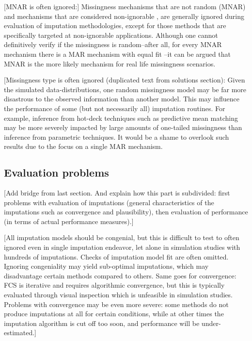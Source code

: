 \documentclass[bimj,fleqn]{w-art}
\theoremstyle{plain}
\theoremstyle{definition}
\begin{document}
[MNAR is often ignored:] Missingness mechanisms that are not random (MNAR) and mechanisms that are considered non-ignorable \citep[see e.g.][]{rubi76}, are generally ignored during evaluation of imputation methodologies, except for those methods that are specifically targeted at non-ignorable applications. Although one cannot definitively verify if the missingness is random--after all, for every MNAR mechanism there is a MAR mechanism with equal fit \citep{molenberghs2008every}--it can be argued that MNAR is the more likely mechanism for real life missingness scenarios. 

[Missingness type is often ignored (duplicated text from solutions section): Given the simulated data-distributions, one random missingness model may be far more disastrous to the observed information than another model. This may influence the performance of some (but not necessarily all) imputation routines. For example, inference from hot-deck techniques such as predictive mean matching \citep{little1988missing, rubin1986statistical} may be more severely impacted by large amounts of one-tailed missingness than inference from parametric techniques. It would be a shame to overlook such results due to the focus on a single MAR mechanism.


\subsection{Evaluation problems}



[Add bridge from last section. And explain how this part is subdivided: first problems with evaluation of imputations (general characteristics of the imputations such as convergence and plausibility), then evaluation of performance (in terms of actual performance measures).]

[All imputation models should be congenial, but this is difficult to test to often ignored even in single imputation endeavor, let alone in simulation studies with hundreds of imputations. Checks of imputation model fit are often omitted. Ignoring congeniality may yield sub-optimal imputations, which may disadvantage certain methods compared to others. Same goes for convergence: FCS is iterative and requires algorithmic convergence, but this is typically evaluated through visual inspection which is unfeasible in simulation studies. Problems with convergence may be even more severe: some methods do not produce imputations at all for certain conditions, while at other times the imputation algorithm is cut off too soon, and performance will be under-estimated.]
\end{document}
